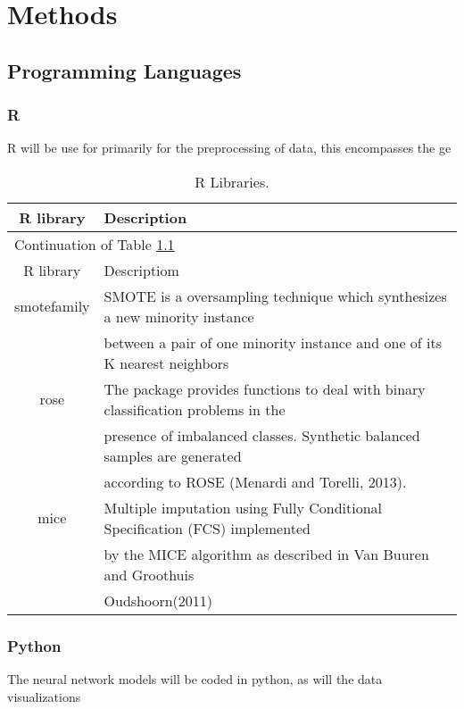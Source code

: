 \chapter{Methods}\label{ch:eval}


\section{Programming Languages}

\subsection{R}
R will be use for primarily for the preprocessing of data, this encompasses the ge

 \begin{longtable}[c]{| c | l |}
 \caption{R Libraries.\label{long}}\\

 
 \hline
 R library & Description\\
 \hline
 \endfirsthead

 \hline
 \multicolumn{2}{|l|}{Continuation of Table \ref{long}}\\
 \hline
 R library & Descriptiom\\
 \hline
 \endhead

 \hline
 \endlastfoot

smotefamily & SMOTE is a oversampling technique which synthesizes a new minority instance  \\
& between a pair of one minority instance and one of its K nearest neighbors\\
 \hline
rose & The package provides functions to deal with binary classification problems in the \\
& presence of imbalanced classes. Synthetic balanced samples are generated \\ 
& according to ROSE (Menardi and Torelli, 2013).\\
 \hline
 mice & Multiple imputation using Fully Conditional Specification (FCS) implemented \\
 & by the MICE algorithm as described in Van Buuren and Groothuis \\ 
 & Oudshoorn(2011)
 \end{longtable}

\subsection{Python}
The neural network models will be coded in python, as will the data visualizations

